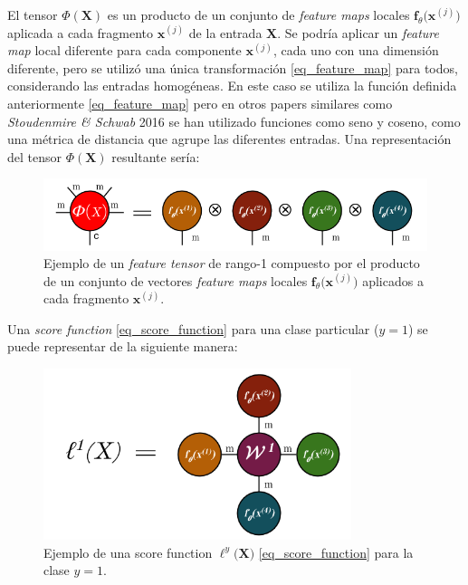 \documentclass[spanish]{article}
\theoremstyle{definition}
\theoremstyle{remark}
\numberwithin{equation}{section}
\numberwithin{equation}{section} %
\begin{document}
El tensor $\mathit{\Phi}(\boldsymbol{X})$ es un producto de un conjunto de \textit{feature maps} locales $\boldsymbol{f}_\theta\big(\boldsymbol{x}^{(j)}\big)$ aplicada a cada fragmento $\boldsymbol{x}^{(j)}$ de la entrada $\boldsymbol{X}$. Se podría aplicar un \textit{feature map} local diferente para cada componente $\boldsymbol{x}^{(j)}$, cada uno con una dimensión diferente, pero se utilizó una única transformación \eqref{eq_feature_map} para todos, considerando las entradas homogéneas. En este caso se utiliza la función definida anteriormente \eqref{eq_feature_map} pero en otros papers similares como \textit{Stoudenmire \& Schwab} 2016 \cite{stoudenmire2016supervised} se han utilizado funciones como seno y coseno, como una métrica de distancia que agrupe las diferentes entradas. Una representación del tensor $\mathit{\Phi}(\boldsymbol{X})$ resultante sería: \par
\begin{figure}[H]
 \centering
 \includegraphics[width=14cm]{img/ejemplo_tensor_feature_map.png}
\caption[Ejemplo Tensor Feature]{\footnotesize{ Ejemplo de un \textit{feature tensor} de rango-1 compuesto por el producto de un conjunto de vectores \textit{feature maps} locales $\boldsymbol{f}_\theta\big(\boldsymbol{x}^{(j)}\big)$ aplicados a cada fragmento $\boldsymbol{x}^{(j)}$.}}
\label{fig:feature_tensor}
\end{figure}\par
Una {\it score function} \eqref{eq_score_function} para una clase particular ($y=1$) se puede representar de la siguiente manera:
\begin{figure}[H]
 \centering
 \includegraphics[width=9cm]{img/ejemplo_score_function_tensores.png}
\caption[Ejemplo \textit{score function} ]{\footnotesize{ Ejemplo de una score function $\ell^y\big(\boldsymbol{X}\big)$ \eqref{eq_score_function} para la clase $y=1$.}}
\label{fig:score_function_tensor}
\end{figure}
\end{document}
